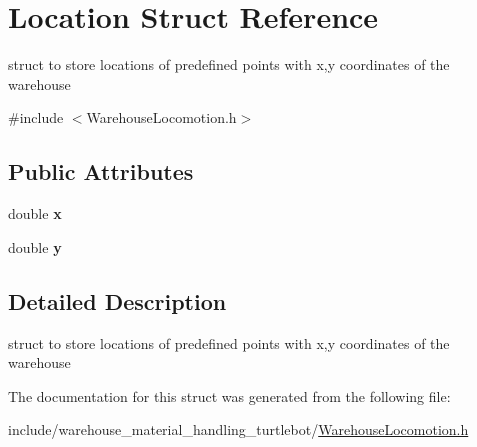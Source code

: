 \hypertarget{structLocation}{}\section{Location Struct Reference}
\label{structLocation}


struct to store locations of predefined points with x,y coordinates of the warehouse  




{\ttfamily \#include $<$Warehouse\+Locomotion.\+h$>$}

\subsection*{Public Attributes}
\begin{DoxyCompactItemize}
\item 
double {\bfseries x}\hypertarget{structLocation_ac794205a47bb99febce79b4c6d614ec1}{}\label{structLocation_ac794205a47bb99febce79b4c6d614ec1}

\item 
double {\bfseries y}\hypertarget{structLocation_a7981376ddbae36481fe6058146e1a130}{}\label{structLocation_a7981376ddbae36481fe6058146e1a130}

\end{DoxyCompactItemize}


\subsection{Detailed Description}
struct to store locations of predefined points with x,y coordinates of the warehouse 

The documentation for this struct was generated from the following file\+:\begin{DoxyCompactItemize}
\item 
include/warehouse\+\_\+material\+\_\+handling\+\_\+turtlebot/\hyperlink{WarehouseLocomotion_8h}{Warehouse\+Locomotion.\+h}\end{DoxyCompactItemize}
